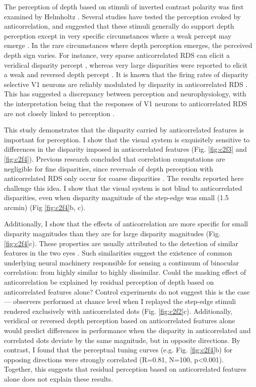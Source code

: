 The perception of depth based on stimuli of inverted contrast polarity was first examined by Helmholtz \cite{helmholtz1909physiological}. Several studies have tested the perception evoked by anticorrelation, and suggested that these stimuli generally do support depth perception \cite{BLTJ:BLTJ3954} except in very specific circumstances where a weak percept may emerge \cite{JULESZ:1964ff,Cogan:1993yr,Cumming:1998ib,Read:2000kx,Hibbard2014}. In the rare circumstances where depth perception emerges, the perceived depth sign varies. For instance, very sparse anticorrelated RDS can elicit a veridical disparity percept \cite{Cogan:1993yr,Cumming:1998ib}, whereas very large disparities were reported to elicit a weak and reversed depth percept \cite{Doi:2011ku}. It is known that the firing rates of disparity selective V1 neurons are reliably modulated by disparity in anticorrelated RDS \cite{Cumming:1997ve,Samonds:2013cs}. This has suggested a discrepancy between perception and neurophysiology, with the interpretation being that the responses of V1 neurons to anticorrelated RDS are not closely linked to perception \cite{Cumming:1998ib}.

This study demonstrates that the disparity carried by anticorrelated features is important for perception. I show that the visual system is exquisitely sensitive to differences in the disparity imposed in anticorrelated features (Fig. \ref{fig:c2f3} and \ref{fig:c2f4}). Previous research concluded that correlation computations are negligible for fine disparities, since reversals of depth perception with anticorrelated RDS only occur for coarse disparities \cite{Doi:2011ku}. The results reported here challenge this idea. I show that the visual system is not blind to anticorrelated disparities, even when disparity magnitude of the step-edge was small (1.5 arcmin) (Fig \ref{fig:c2f4}b, c).

Additionally, I show that the effects of anticorrelation are more specific for small disparity magnitudes than they are for large disparity magnitudes (Fig. \ref{fig:c2f4}c). These properties are usually attributed to the detection of similar features in the two eyes \cite{Badcock:1985ly,Lehky:1990fk,Stevenson:1992kx}. Such similarities suggest the existence of common underlying neural machinery responsible for sensing a continuum of binocular correlation: from highly similar to highly dissimilar.
Could the masking effect of anticorrelation be explained by residual perception of depth based on anticorrelated features alone? Control experiments do not suggest this is the case --- observers performed at chance level when I replayed the step-edge stimuli rendered exclusively with anticorrelated dots (Fig. \ref{fig:c2f2}c). Additionally, veridical or reversed depth perception based on anticorrelated features alone would predict differences in performance when the disparity in anticorrelated and correlated dots deviate by the same magnitude, but in opposite directions. By contrast, I found that the perceptual tuning curves (e.g. Fig. \ref{fig:c2f4}b) for opposing directions were strongly correlated (R=0.81, N=100, p<0.001). Together, this suggests that residual perception based on anticorrelated features alone does not explain these results.


